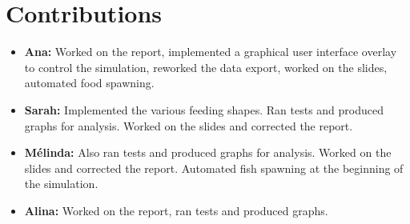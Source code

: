 \documentclass[9pt]{pnas-new}
\begin{document}
\section{Contributions}
\begin{itemize} 
    \item \textbf{Ana:} Worked on the report, implemented a graphical user interface overlay to control the simulation, reworked the data export, worked on the slides, automated food spawning.

    \item \textbf{Sarah:} Implemented the various feeding shapes. Ran tests and produced graphs for analysis. Worked on the slides and corrected the report.

    \item \textbf{Mélinda:} Also ran tests and produced graphs for analysis. Worked on the slides and corrected the report. Automated fish spawning at the beginning of the simulation. 

    \item \textbf{Alina:} Worked on the report, ran tests and produced graphs.
    
\end{itemize}

    

\begin{multicols}{2}
\section*{\bibname}

\end{multicols}
\end{document}
